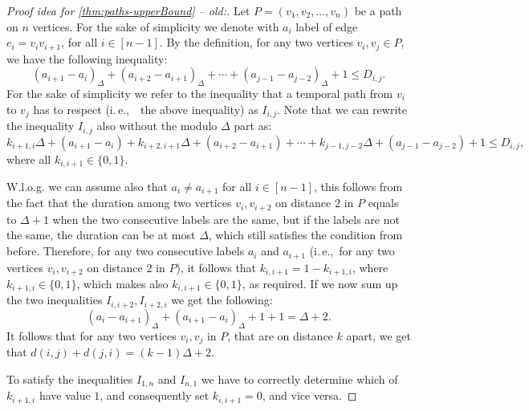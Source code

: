 \documentclass[a4paper,UKenglish,cleveref, autoref, thm-restate]{lipics-v2021}
\newcommand{\ie}{i.\,e.,\ }
\begin{document}
\begin{proof}[Proof idea for \cref{thm:paths-upperBound} -- old:]
	Let $P = (v_1, v_2, \dots, v_n)$ be a path on $n$ vertices.
	For the sake of simplicity we denote with $a_i$ label of edge $e_i =v_iv_{i+1}$, for all $i \in [n-1]$.
	By the definition, for any two vertices $v_i,v_j \in P$, we have the following inequality:
	\begin{equation*}
		(a_{i+1} - a_i)_\Delta + (a_{i+2} - a_{i+1})_\Delta + \cdots + (a_{j-1} - a_{j-2})_\Delta + 1
		\leq D_{i,j}.
	\end{equation*}
	For the sake of simplicity we refer to the inequality that a temporal path from $v_i$ to $v_j$ has to respect (\ie~the above inequality) 
	as $I_{i,j}$.
	Note that we can rewrite the inequality $I_{i,j}$ also without the modulo $\Delta$ part as:
	\begin{equation*}
		k_{i+1,i} \Delta + (a_{i+1} - a_i)+ k_{i+2,i+1} \Delta + (a_{i+2} - a_{i+1}) + \cdots + k_{j-1,j-2} \Delta + (a_{j-1} - a_{j-2})+ 1
		\leq D_{i,j},
	\end{equation*}
	where all $k_{i,i+1} \in \{0,1\}$.
	
	W.l.o.g. we can assume also that $a_i \neq a_{i+1}$ for all $i \in [n-1]$,
	this follows from the fact that the duration among two vertices $v_i, v_{i+2}$ on distance $2$ in $P$ equals to $\Delta + 1$ when the two consecutive labels are the same, but if the labels are not the same, the duration can be at most $\Delta$, which still satisfies the condition from before.
	Therefore, for any two consecutive labels $a_i$ and $a_{i+1}$ (\ie for any two vertices $v_i, v_{i+2}$ on distance $2$ in $P$), 
	it follows that 
	$k_{i, i+1} = 1 - k_{i+1,i}$, where $k_{i+1,i} \in \{0,1\}$, which makes also $k_{i,i+1} \in \{0,1\}$, as required.
	If we now sum up the two inequalities $I_{i,i+2}, I_{i+2,i}$ we get the following:
	\begin{equation*}
		(a_i-a_{i+1})_\Delta + (a_{i+1}-a_i)_\Delta +1 +1 = \Delta + 2.
	\end{equation*}
	It follows that for any two vertices $v_i, v_j$ in $P$, that are on distance $k$ apart, 
	we get that $d(i,j) + d(j,i) = (k-1) \Delta + 2$.
	
	To satisfy the inequalities $I_{1,n}$ and $I_{n,1}$ we have to correctly determine which of $k_{i+1,i}$ have value $1$, and consequently set $k_{i,i+1} = 0$,
	and vice versa.
	

\end{proof}
\end{document}
